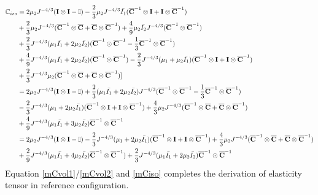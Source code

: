 \begin{equation} \label{mCiso}
\begin{split}
\mathbb{C}_{iso} 
&= 
2\mu_2{J}^{-4/3}(\bold{I} \otimes \bold{I} - \mathbb{I}) - \frac{2}{3}\mu_2J^{-4/3}\bar{I_1}({\overline{\bold{C}}}^{-1} \otimes \bold{I} + \bold{I} \otimes {\overline{\bold{C}}}^{-1}) \\
&+
\frac{2}{3}\mu_2J^{-4/3}({\overline{\bold{C}}}^{-1} \otimes {\overline{\bold{C}}} + {\overline{\bold{C}}} \otimes {\overline{\bold{C}}}^{-1}) + \frac{4}{9}\mu_2\bar{I_2}J^{-4/3}({\overline{\bold{C}}}^{-1} \otimes {\overline{\bold{C}}}^{-1}) \\
&+
\frac{2}{3}J^{-4/3}(\mu_1\bar{I_1} + 2\mu_2\bar{I_2})({\overline{\bold{C}}}^{-1} \odot {{\overline{\bold{C}}}}^{-1} - \frac{1}{3}{{\overline{\bold{C}}}}^{-1} \otimes {\overline{{\bold{C}}}}^{-1}) \\
&+
\frac{4}{9}J^{-4/3} (\mu_1\bar{I_1} + 2\mu_2\bar{I_2})({\overline{\bold{C}}}^{-1} \otimes {\overline{\bold{C}}}^{-1}) - \frac{2}{3}J^{-4/3}(\mu_1+\mu_2\bar{I_1})({\overline{\bold{C}}}^{-1} \otimes \bold{I} + \bold{I} \otimes {\overline{\bold{C}}}^{-1})\\
&+ \frac{2}{3}J^{-4/3}\mu_2({\overline{\bold{C}}}^{-1} \otimes {\overline{\bold{C}}}+{\overline{\bold{C}}} \otimes {\overline{\bold{C}}}^{-1}) ] \\
&=
2\mu_2{J}^{-4/3}(\bold{I} \otimes \bold{I} - \mathbb{I}) + \frac{2}{3}(\mu_1\bar{I_1} + 2\mu_2\bar{I_2})J^{-4/3}({\overline{\bold{C}}}^{-1} \odot {\overline{\bold{C}}}^{-1} - \frac{1}{3}{\overline{\bold{C}}}^{-1} \otimes {\overline{\bold{C}}}^{-1}) \\
&-
\frac{2}{3}J^{-4/3}(\mu_1 + 2\mu_2\bar{I_1})({\overline{\bold{C}}}^{-1} \otimes \bold{I} + \bold{I} \otimes {\overline{\bold{C}}}^{-1}) + \frac{4}{3}\mu_2J^{-4/3}({\overline{\bold{C}}}^{-1} \otimes {\overline{\bold{C}}} + {\overline{\bold{C}}} \otimes {\overline{\bold{C}}}^{-1}) \\
&+
\frac{4}{9}J^{-4/3}(\mu_1\bar{I_1} + 3\mu_2\bar{I_2}){\overline{\bold{C}}}^{-1} \otimes {\overline{\bold{C}}}^{-1} \\
&=
2\mu_2{J}^{-4/3}(\bold{I} \otimes \bold{I} - \mathbb{I}) - \frac{2}{3}J^{-4/3}(\mu_1 + 2\mu_2\bar{I_1})({\overline{\bold{C}}}^{-1} \otimes \bold{I} + \bold{I} \otimes {\overline{\bold{C}}}^{-1}) + \frac{4}{3}\mu_2J^{-4/3}({\overline{\bold{C}}}^{-1} \otimes {\overline{\bold{C}}} + {\overline{\bold{C}}} \otimes {\overline{\bold{C}}}^{-1}) \\
&+
\frac{2}{9}J^{-4/3}(\mu_1\bar{I_1} + 4\mu_2\bar{I_2}) {\overline{\bold{C}}}^{-1} \otimes {\overline{\bold{C}}}^{-1}) + \frac{2}{3}J^{-4/3}(\mu_1\bar{I_1} + 2\mu_2\bar{I_2}){\overline{\bold{C}}}^{-1} \odot {\overline{\bold{C}}}^{-1} 
\end{split}
\end{equation} 
Equation \ref{mCvol1}/\ref{mCvol2} and \ref{mCiso} completes the derivation of elasticity tensor in reference configuration.

